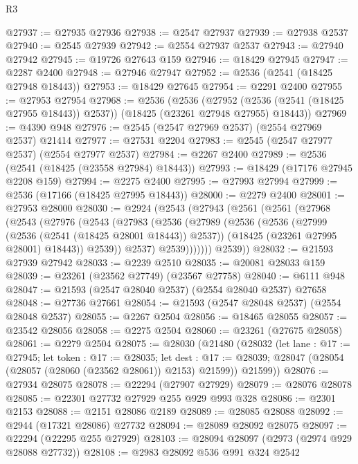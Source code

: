 \begin{lexlean}{R3}
\begin{coremodule}
@27937 := @27935 @27936
@27938 := @2547 @27937
@27939 := @27938 @2537
@27940 := @2545 @27939
@27942 := @2554 @27937 @2537
@27943 := @27940 @27942
@27945 := @19726 @27643 @159
@27946 := @18429 @27945
@27947 := @2287 @2400
@27948 := @27946 @27947
@27952 := @2536 (@2541 (@18425 @27948 @18443))
@27953 := @18429 @27645
@27954 := @2291 @2400
@27955 := @27953 @27954
@27968 := @2536
    (@2536
      (@27952 (@2536 (@2541 (@18425 @27955 @18443)) @2537))
      (@18425 (@23261 @27948 @27955) @18443))
@27969 := @4390 @948
@27976 := @2545 (@2547 @27969 @2537) (@2554 @27969 @2537) @21414
@27977 := @27531 @2204
@27983 := @2545 (@2547 @27977 @2537) (@2554 @27977 @2537)
@27984 := @2267 @2400
@27989 := @2536 (@2541 (@18425 (@23558 @27984) @18443))
@27993 := @18429 (@17176 @27945 @2208 @159)
@27994 := @2275 @2400
@27995 := @27993 @27994
@27999 := @2536 (@17166 (@18425 @27995 @18443))
@28000 := @2279 @2400
@28001 := @27953 @28000
@28030 := @2924
    (@2543
      (@27943
        (@2561
          (@2561
            (@27968
              (@2543
                (@27976
                  (@2543
                    (@27983
                      (@2536
                        (@27989
                          (@2536
                            (@2536
                              (@27999 (@2536 (@2541 (@18425 @28001 @18443)) @2537))
                              (@18425 (@23261 @27995 @28001) @18443))
                            @2539))
                        @2537)
                      @2539)))))))
        @2539))
@28032 := @21593 @27939 @27942
@28033 := @2239 @2510
@28035 := @20081 @28033 @159
@28039 := @23261 (@23562 @27749) (@23567 @27758)
@28040 := @6111 @948
@28047 := @21593 (@2547 @28040 @2537) (@2554 @28040 @2537) @27658
@28048 := @27736 @27661
@28054 := @21593 (@2547 @28048 @2537) (@2554 @28048 @2537)
@28055 := @2267 @2504
@28056 := @18465 @28055
@28057 := @23542 @28056
@28058 := @2275 @2504
@28060 := @23261 (@27675 @28058)
@28061 := @2279 @2504
@28075 := @28030
    (@21480
      (@28032
        (let lane : @17 := @27945;
        let token : @17 := @28035;
        let dest : @17 := @28039; @28047 (@28054 (@28057 (@28060 (@23562 @28061)) @2153) @21599))
        @21599))
@28076 := @27934 @28075
@28078 := @22294 (@27907 @27929)
@28079 := @28076 @28078
@28085 := @22301 @27732 @27929 @255 @929 @993 @328
@28086 := @2301 @2153
@28088 := @2151 @28086 @2189
@28089 := @28085 @28088
@28092 := @2944 (@17321 @28086) @27732
@28094 := @28089 @28092 @28075
@28097 := @22294 (@22295 @255 @27929)
@28103 := @28094 @28097 (@2973 (@2974 @929 @28088 @27732))
@28108 := @2983 @28092 @536 @991 @324 @2542

\end{coremodule}
\end{lexlean}
